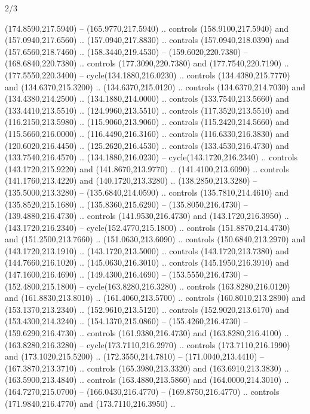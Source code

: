 \begin{flagdescription}{2/3}
\begin{scope}[xshift=0.5\flaglength,yshift=0.5\flagwidth,scale=\stretchfactor]
\begin{scope}[scale=0.001645\flagwidth,yshift=65mm,xshift=-63mm]
\begin{scope}[y=0.80pt, x=0.80pt, yscale=-1,]
\begin{scope}[cm={{1.33333,0.0,0.0,1.33333,(0.0,1e-05)}}]
  (174.8590,217.5940) -- (165.9770,217.5940) .. controls (158.9100,217.5940) and
  (157.0940,217.6560) .. (157.0940,217.8830) .. controls (157.0940,218.0390) and
  (157.6560,218.7460) .. (158.3440,219.4530) -- (159.6020,220.7380) --
  (168.6840,220.7380) .. controls (177.3090,220.7380) and (177.7540,220.7190) ..
  (177.5550,220.3400) -- cycle(134.1880,216.0230) .. controls
  (134.4380,215.7770) and (134.6370,215.3200) .. (134.6370,215.0120) .. controls
  (134.6370,214.7030) and (134.4380,214.2500) .. (134.1880,214.0000) .. controls
  (133.7540,213.5660) and (133.4410,213.5510) .. (124.9960,213.5510) .. controls
  (117.3520,213.5510) and (116.2150,213.5980) .. (115.9060,213.9060) .. controls
  (115.2420,214.5660) and (115.5660,216.0000) .. (116.4490,216.3160) .. controls
  (116.6330,216.3830) and (120.6020,216.4450) .. (125.2620,216.4530) .. controls
  (133.4530,216.4730) and (133.7540,216.4570) .. (134.1880,216.0230) --
  cycle(143.1720,216.2340) .. controls (143.1720,215.9220) and
  (141.8670,213.9770) .. (141.4100,213.6090) .. controls (141.1760,213.4220) and
  (140.1720,213.3280) .. (138.2850,213.3280) -- (135.5000,213.3280) --
  (135.6840,214.0590) .. controls (135.7810,214.4610) and (135.8520,215.1680) ..
  (135.8360,215.6290) -- (135.8050,216.4730) -- (139.4880,216.4730) .. controls
  (141.9530,216.4730) and (143.1720,216.3950) .. (143.1720,216.2340) --
  cycle(152.4770,215.1800) .. controls (151.8870,214.4730) and
  (151.2500,213.7660) .. (151.0630,213.6090) .. controls (150.6840,213.2970) and
  (143.1720,213.1910) .. (143.1720,213.5000) .. controls (143.1720,213.7380) and
  (144.7660,216.1020) .. (145.0630,216.3010) .. controls (145.1950,216.3910) and
  (147.1600,216.4690) .. (149.4300,216.4690) -- (153.5550,216.4730) --
  (152.4800,215.1800) -- cycle(163.8280,216.3280) .. controls
  (163.8280,216.0120) and (161.8830,213.8010) .. (161.4060,213.5700) .. controls
  (160.8010,213.2890) and (153.1370,213.2340) .. (152.9610,213.5120) .. controls
  (152.9020,213.6170) and (153.4300,214.3240) .. (154.1370,215.0860) --
  (155.4260,216.4730) -- (159.6290,216.4730) .. controls (161.9380,216.4730) and
  (163.8280,216.4100) .. (163.8280,216.3280) -- cycle(173.7110,216.2970) ..
  controls (173.7110,216.1990) and (173.1020,215.5200) .. (172.3550,214.7810) --
  (171.0040,213.4410) -- (167.3870,213.3710) .. controls (165.3980,213.3320) and
  (163.6910,213.3830) .. (163.5900,213.4840) .. controls (163.4880,213.5860) and
  (164.0000,214.3010) .. (164.7270,215.0700) -- (166.0430,216.4770) --
  (169.8750,216.4770) .. controls (171.9840,216.4770) and (173.7110,216.3950) ..

\end{scope}
\end{scope}
\end{scope}
\end{scope}
\end{flagdescription}
